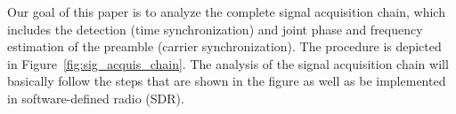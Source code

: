 Our goal of this paper is to analyze the complete signa\-l acquisition chain, which includes
the detection (time synchronization) and joint phase and frequency estimation of the preamble (carrier synchronization). 
The procedure is depicted in Figure~\ref{fig:sig_acquis_chain}.
The analysis of the signal acquisition chain will basically follow the steps 
that are shown in the figure as well as be implemented in software-defined radio (SDR).